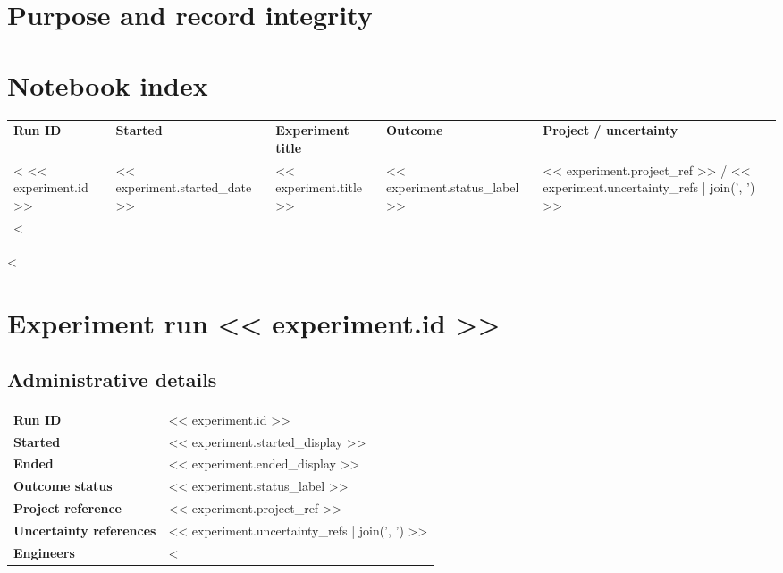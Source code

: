\documentclass[11pt]{article}
\begin{document}
\RDTitlePage
\tableofcontents
\clearpage

\section{Purpose and record integrity}


\section{Notebook index}
\small
{}
\begin{xltabular}{\textwidth}{@{}L{2.6cm}L{2.2cm}Y L{2.0cm}L{3.0cm}@{}}
\textbf{Run ID} & \textbf{Started} & \textbf{Experiment title} & \textbf{Outcome} & \textbf{Project / uncertainty} \\
<%
<< experiment.id >> & << experiment.started_date >> & << experiment.title >> & << experiment.status_label >> & << experiment.project_ref >> / << experiment.uncertainty_refs | join(', ') >> \\
<%
\end{xltabular}
\normalsize

<%
\clearpage
\section{Experiment run << experiment.id >>}

\subsection{Administrative details}
\begin{tabularx}{\textwidth}{@{}L{4.0cm}Y@{}}
\textbf{Run ID} & << experiment.id >> \\
\textbf{Started} & << experiment.started_display >> \\
\textbf{Ended} & << experiment.ended_display >> \\
\textbf{Outcome status} & << experiment.status_label >> \\
\textbf{Project reference} & << experiment.project_ref >> \\
\textbf{Uncertainty references} & << experiment.uncertainty_refs | join(', ') >> \\
\textbf{Engineers} & <%
\end{tabularx}
\end{document}

